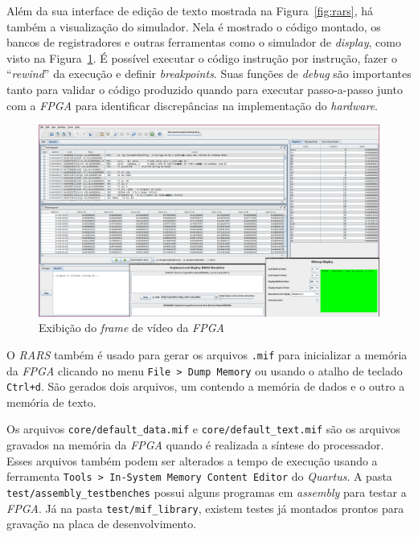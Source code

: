     { Além da sua interface de edição de texto mostrada na Figura~\ref{fig:rars},
        há também a visualização do simulador. Nela é mostrado o código montado,
        os bancos de registradores e outras ferramentas como o simulador de
        \textit{display}, como visto na Figura~\ref{fig:rars_debug}. É possível
        executar o código instrução por instrução, fazer o ``\textit{rewind}''
        da execução e definir \textit{breakpoints}. Suas funções de \textit{debug}
        são importantes tanto para validar o código produzido quando para executar
        passo-a-passo junto com a \textit{FPGA} para identificar discrepâncias
        na implementação do \textit{hardware}.
    }

    \begin{figure}[H]
    \centering
        \includegraphics[width=.9\linewidth]{../images/rars_debug.png}
        \caption{Exibição do \textit{frame} de vídeo da \textit{FPGA}}
        \label{fig:rars_debug}
    \end{figure}

    { O \textit{RARS} também é usado para gerar os arquivos \texttt{.mif} para
        inicializar a memória da \textit{FPGA} clicando no menu \texttt{File > Dump Memory}
        ou usando o atalho de teclado \texttt{Ctrl+d}. São gerados dois arquivos,
        um contendo a memória de dados e o outro a memória de texto.
    }

    { Os arquivos \texttt{core/default\_data.mif} e \texttt{core/default\_text.mif}
        são os arquivos gravados na memória da \textit{FPGA} quando é realizada a
        síntese do processador. Esses arquivos também podem ser alterados a tempo
        de execução usando a ferramenta \texttt{Tools > In-System Memory Content
        Editor} do \textit{Quartus}. A pasta \texttt{test/assembly\_testbenches}
        possui alguns programas em \textit{assembly} para testar a \textit{FPGA}.
        Já na pasta \texttt{test/mif\_library}, existem testes já montados prontos
        para gravação na placa de desenvolvimento.
    }

